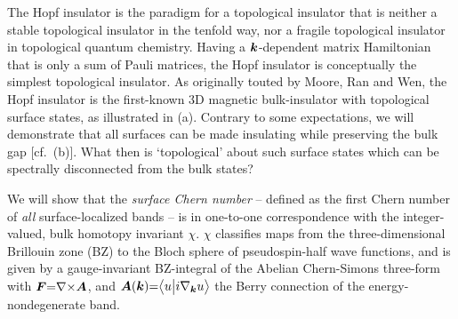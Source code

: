 \documentclass[aps,prl,showpacs,twocolumn,superscriptaddress]{revtex4-1}
\begin{document}
\maketitle

The Hopf insulator\cite{Hopfinsulator_Moore} is the paradigm for a topological insulator that is neither a stable topological insulator in the tenfold way,\cite{schnyder_classify3DTIandTSC,kitaev_periodictable} nor a fragile topological insulator\cite{po_fragile,crystalsplit_AAJHWCLL,bouhon_wilsonloopapproach} in topological quantum chemistry.\cite{bradlyn_disconnectedEBR,zhida_fragileaffinemonoid} Having a $\boldsymbol{k}$-dependent matrix Hamiltonian that is only a sum of Pauli matrices, the Hopf insulator is conceptually the simplest topological insulator. As originally touted by Moore, Ran and Wen,\cite{Hopfinsulator_Moore} the Hopf insulator is the first-known 3D magnetic bulk-insulator with topological surface states, as illustrated in (a).  Contrary to some expectations,\cite{protectedHopf_chunxiao,hopfsurfacestates_deng,kennedy_hopfchern} we will demonstrate that all surfaces can be made insulating while preserving the bulk gap [cf.\ (b)]. What then is `topological' about such surface states which can be spectrally disconnected from the bulk states? 

We will show that  the \textit{surface Chern number} -- defined as the first Chern number of \textit{all} surface-localized bands -- is in one-to-one correspondence with the  integer-valued, bulk homotopy  invariant $\chi$. $\chi$  classifies  maps from the three-dimensional Brillouin zone (BZ) to the Bloch sphere of pseudospin-half wave functions,\cite{pontrjagin_classification,kennedy_hopfchern}  and is given by a gauge-invariant BZ-integral of the Abelian Chern-Simons three-form\cite{wilczekzee_linkingnumbers,Hopfinsulator_Moore}
with $\boldsymbol{F}{=}\nabla{\times}\boldsymbol{A}$, and $\boldsymbol{A}(\boldsymbol{k}){=}\big\langle u \big| i\nabla_{\boldsymbol{k}} u \big\rangle$ the Berry connection of the energy-nondegenerate band.\cite{berry_quantalphase}
\end{document}
